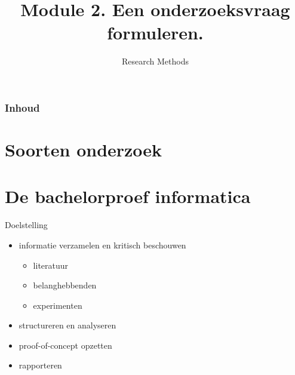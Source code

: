 \documentclass[aspectratio=169]{beamer}
\title{Module 2. Een onderzoeksvraag formuleren.}
\subtitle{Research Methods}
\author{\lecturers}   %
\date{\academicyear}
\begin{document}
\begin{frame}
  \maketitle
\end{frame}

\begin{frame}
  \frametitle{Inhoud}

  \tableofcontents
\end{frame}


\section{Soorten onderzoek}


\section{De bachelorproef informatica}

\begin{frame}{Doelstelling}
  
  
  \begin{itemize}
    \item informatie verzamelen en kritisch beschouwen
    \begin{itemize}
      \item literatuur
      \item belanghebbenden
      \item experimenten
    \end{itemize}
    \item structureren en analyseren
    \item proof-of-concept opzetten
    \item rapporteren
  \end{itemize}
  
\end{frame}
\end{document}
